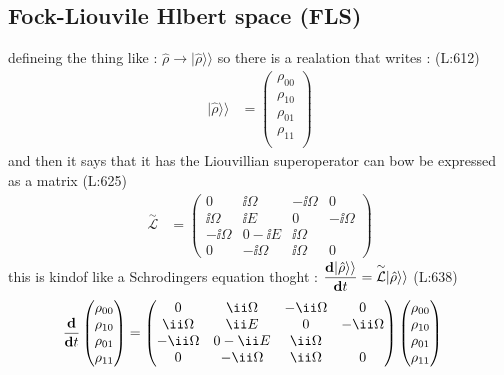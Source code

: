  \subsection{Fock-Liouvile Hlbert space  (FLS)}
 defineing the thing like : 
 $ \hat{\rho }\rightarrow |\hat{\rho }\rangle\rangle  $  so there is a realation that writes : 
(L:612)
\begin{equation}
\begin{split}
|\hat{\rho }\rangle\rangle &=\begin{pmatrix} 
\rho _{00}\\
\rho _{10}\\
\rho _{01}\\
\rho _{11}\\
\end{pmatrix} 
\end{split}
\end{equation}
 and then it says that it has the Liouvillian superoperator 
 can bow be expressed as a matrix 
(L:625)
\begin{equation}
\begin{split}
\overset{\sim}{\mathcal{L }}&=\begin{pmatrix} 
0&\ii \Omega &-\ii \Omega &0\\
\ii \Omega &\ii E &0&-\ii \Omega \\
-\ii \Omega &0-\ii E &\ii \Omega \\
0&-\ii \Omega &\ii \Omega &0\end{pmatrix} 
\end{split}
\end{equation}
 this is kindof like a Schrodingers equation thoght : 
 $ \dfrac{\bold{d}|\hat{\rho }\rangle\rangle }{\bold{d}t }=\overset{\sim}{\mathcal{L }}|\hat{\rho }\rangle\rangle  $ (L:638)
\begin{equation}
\begin{split}
\dfrac{\bold{d}}{\bold{d}t }\begin{pmatrix} 
\rho _{00}\\
\rho _{10}\\
\rho _{01}\\
\rho _{11}\\
\end{pmatrix} 
&=\begin{pmatrix} 
0&\ii \Omega &-\ii \Omega &0\\
\ii \Omega &\ii E &0&-\ii \Omega \\
-\ii \Omega &0-\ii E &\ii \Omega \\
0&-\ii \Omega &\ii \Omega &0\end{pmatrix} 
\begin{pmatrix} 
\rho _{00}\\
\rho _{10}\\
\rho _{01}\\
\rho _{11}\\
\end{pmatrix} 
\end{split}
\end{equation}

